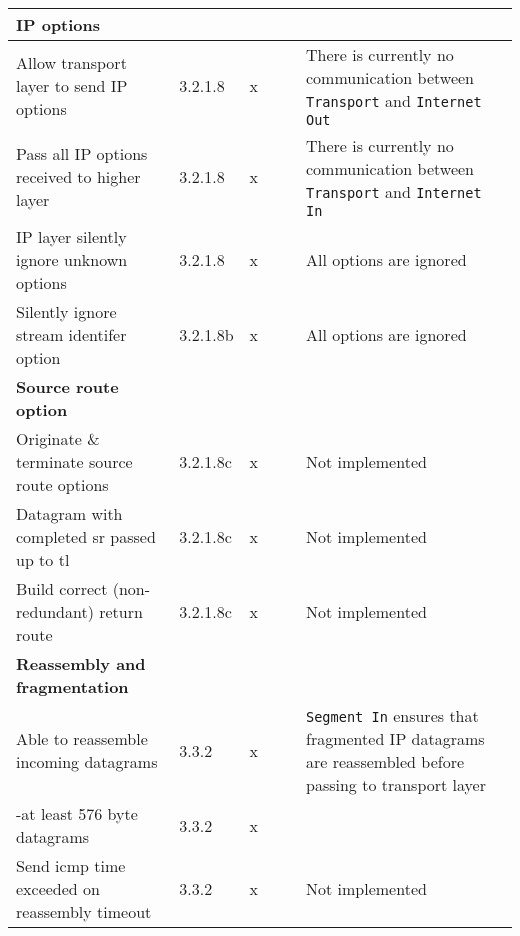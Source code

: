 \begin{longtable}{ | p{} | p{} | p{} |  p{} | p{} | p{} |}
\textbf{IP options} \\ \hline
  Allow transport layer to send IP options       &3.2.1.8 &x& & \cellcolor{red!25 }& There is currently no communication between \texttt{Transport} and \texttt{Internet Out}\\ \hline
  Pass all IP options received to higher layer       &3.2.1.8 &x& & \cellcolor{red!25 }& There is currently no communication between \texttt{Transport} and \texttt{Internet In}\\ \hline
  IP layer silently ignore unknown options       &3.2.1.8 &x& & \cellcolor{yellow!25}& All options are ignored\\ \hline
  Silently ignore stream identifer option        &3.2.1.8b&x& & \cellcolor{yellow!25 }& All options are ignored\\ \hline

\textbf{Source route option} \\ \hline
  Originate \& terminate source route options     &3.2.1.8c&x& & \cellcolor{red!25 }& Not implemented\\ \hline
  Datagram with completed sr passed up to tl     &3.2.1.8c&x& & \cellcolor{red!25 }& Not implemented\\ \hline
  Build correct (non-redundant) return route     &3.2.1.8c&x& & \cellcolor{red!25 }& Not implemented\\ \hline

\textbf{Reassembly and fragmentation} \\ \hline
  Able to reassemble incoming datagrams          &3.3.2   &x& & \cellcolor{green!25}& \texttt{Segment In} ensures that fragmented IP datagrams are reassembled before passing to transport layer\\ \hline
    -at least 576 byte datagrams                  &3.3.2   &x& & \cellcolor{green!25}\\ \hline
  Send icmp time exceeded on reassembly timeout  &3.3.2   &x& & \cellcolor{red!25 }& Not implemented\\ \hline


\end{longtable}

